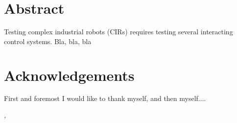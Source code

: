 
\section*{Abstract}
Testing complex industrial robots (CIRs) requires testing several
interacting control systems. Bla, bla, bla


\newpage
\section*{Acknowledgements}
First and foremost I would like to thank myself, and then myself....
 
\hfill \textit{\thethesisauthor, \shortdate}
